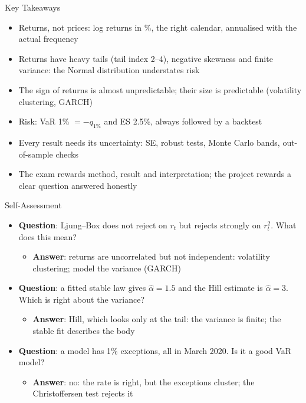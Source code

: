 \begin{frame}{Key Takeaways}
\itemsize{\small}
\begin{itemize}
    \item Returns, not prices: log returns in \%, the right calendar, annualised with the actual frequency
    \item Returns have heavy tails (tail index 2--4), negative skewness and finite variance: the Normal distribution understates risk
    \item The sign of returns is almost unpredictable; their size is predictable (volatility clustering, GARCH)
    \item Risk: VaR 1\% $= -q_{1\%}$ and ES 2.5\%, always followed by a backtest
    \item Every result needs its uncertainty: SE, robust tests, Monte Carlo bands, out-of-sample checks
    \item The exam rewards method, result and interpretation; the project rewards a clear question answered honestly
\end{itemize}
\end{frame}

\begin{frame}{Self-Assessment}
\itemsize{\small}
\begin{itemize}
    \item \textbf{Question}: Ljung--Box does not reject on $r_t$ but rejects strongly on $r_t^2$. What does this mean?
    \begin{itemize}
        \item \textbf{Answer}: returns are uncorrelated but not independent: volatility clustering; model the variance (GARCH)
    \end{itemize}
    \item \textbf{Question}: a fitted stable law gives $\hat\alpha = 1.5$ and the Hill estimate is $\hat\alpha = 3$. Which is right about the variance?
    \begin{itemize}
        \item \textbf{Answer}: Hill, which looks only at the tail: the variance is finite; the stable fit describes the body
    \end{itemize}
    \item \textbf{Question}: a model has 1\% exceptions, all in March 2020. Is it a good VaR model?
    \begin{itemize}
        \item \textbf{Answer}: no: the rate is right, but the exceptions cluster; the Christoffersen test rejects it
    \end{itemize}
\end{itemize}
\end{frame}



